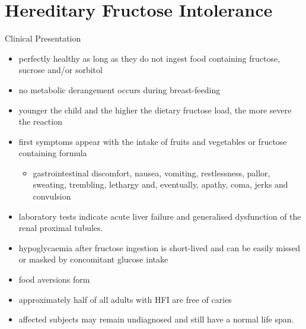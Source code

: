 \documentclass[presentation, smaller]{beamer}
\begin{document}
\section{Hereditary Fructose Intolerance}
\label{sec:org2c0a9bf}
\begin{frame}[label={sec:orga0b0966}]{Clinical Presentation}
\begin{itemize}
\item perfectly healthy as long as they do not ingest food containing fructose, sucrose and/or sorbitol
\item no metabolic derangement occurs during breast-feeding
\item younger the child and the higher the dietary fructose load, the more severe the reaction
\item first symptoms appear with the intake of fruits and vegetables or fructose containing formula
\begin{itemize}
\item gastrointestinal discomfort, nausea, vomiting, restlessness,
pallor, sweating, trembling, lethargy and, eventually, apathy,
coma, jerks and convulsion
\end{itemize}
\item laboratory tests indicate acute liver failure and generalised dysfunction of the renal proximal tubules.
\item hypoglycaemia after fructose ingestion is short-lived and can be easily missed or masked by concomitant glucose intake
\item food aversions form
\item approximately half of all adults with HFI are free of caries
\item affected subjects may remain undiagnosed and still have a normal life span.
\end{itemize}
\end{frame}
\end{document}
